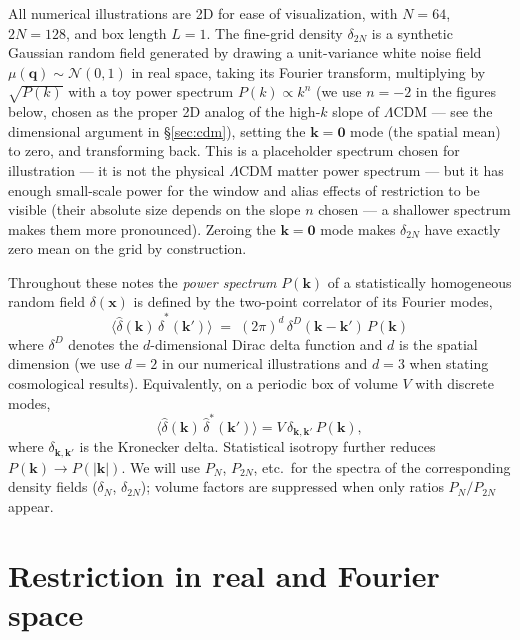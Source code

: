 \documentclass[12pt]{article}
\newcommand{\toyn}{-2}
\begin{document}
All numerical illustrations are 2D for ease of visualization, with
$N=64$, $2N=128$, and box length $L=1$. The fine-grid density
$\delta_{2N}$ is a synthetic Gaussian random field generated by drawing
a unit-variance white noise field $\mu(\mathbf q)\sim\mathcal{N}(0,1)$
in real space, taking its Fourier transform, multiplying by $\sqrt{P(k)}$
with a toy power spectrum $P(k)\propto k^n$ (we use $n=\toyn$ in the
figures below, chosen as the proper 2D analog of the high-$k$ slope of
$\Lambda$CDM --- see the dimensional argument in
\S\ref{sec:cdm}), setting the
$\mathbf k=\mathbf 0$ mode (the spatial mean) to zero, and transforming
back. This is a placeholder spectrum chosen for illustration --- it is
not the physical $\Lambda$CDM matter power spectrum --- but it has
enough small-scale power for the window and alias effects of restriction to
be visible (their absolute size depends on the slope $n$ chosen --- a
shallower spectrum makes them more pronounced). Zeroing the $\mathbf k=\mathbf 0$ mode makes
$\delta_{2N}$ have exactly zero mean on the grid by construction.

Throughout these notes the \emph{power spectrum} $P(\mathbf k)$ of a
statistically homogeneous random field $\delta(\mathbf x)$ is defined
by the two-point correlator of its Fourier modes,
\begin{equation}\label{eq:Pk-def}
  \bigl\langle\hat\delta(\mathbf k)\,\hat\delta^*(\mathbf k')\bigr\rangle
  \;=\; (2\pi)^d\,\delta^D(\mathbf k-\mathbf k')\,P(\mathbf k)
\end{equation}
where $\delta^D$ denotes the $d$-dimensional Dirac delta function and
$d$ is the spatial dimension (we use $d=2$ in our numerical
illustrations and $d=3$ when stating cosmological results).
Equivalently, on a periodic box of volume $V$ with discrete modes,
\begin{equation*}
  \bigl\langle\hat\delta(\mathbf k)\,\hat\delta^*(\mathbf k')\bigr\rangle
  = V\,\delta_{\mathbf k,\mathbf k'}\,P(\mathbf k),
\end{equation*}
where $\delta_{\mathbf k,\mathbf k'}$ is the Kronecker delta.
Statistical isotropy further reduces $P(\mathbf k)\to P(|\mathbf k|)$. We will use $P_N$, $P_{2N}$, etc.\
for the spectra of the corresponding density fields ($\delta_N$,
$\delta_{2N}$); volume factors are suppressed when only ratios
$P_N/P_{2N}$ appear.

\section{Restriction in real and Fourier space}\label{sec:fourier}
\end{document}
